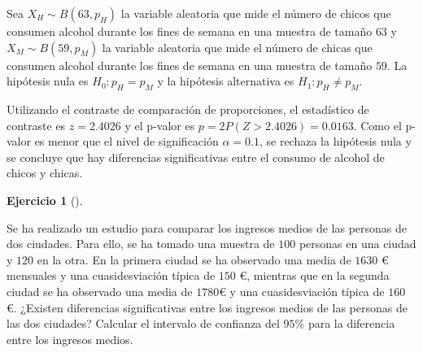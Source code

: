 \documentclass[
  spanish,
  a4paper,
]{scrreport}
\theoremstyle{definition}
\newtheorem{exercise}{Ejercicio}[chapter]
\theoremstyle{remark}
\begin{document}
\begin{tcolorbox}[enhanced jigsaw, arc=.35mm, bottomrule=.15mm, bottomtitle=1mm, breakable, colback=white, colbacktitle=quarto-callout-tip-color!10!white, colframe=quarto-callout-tip-color-frame, coltitle=black, left=2mm, leftrule=.75mm, opacityback=0, opacitybacktitle=0.6, rightrule=.15mm, title=\textcolor{quarto-callout-tip-color}{\faLightbulb}\hspace{0.5em}{Solución}, titlerule=0mm, toprule=.15mm, toptitle=1mm]

Sea \(X_H\sim B(63,p_H)\) la variable aleatoria que mide el número de
chicos que consumen alcohol durante los fines de semana en una muestra
de tamaño \(63\) y \(X_M\sim B(59,p_M)\) la variable aleatoria que mide
el número de chicas que consumen alcohol durante los fines de semana en
una muestra de tamaño \(59\). La hipótesis nula es \(H_0: p_H=p_M\) y la
hipótesis alternativa es \(H_1: p_H\neq p_M\).

Utilizando el contraste de comparación de proporciones, el estadístico
de contraste es \(z=2.4026\) y el p-valor es
\(p =2 P(Z>2.4026) = 0.0163\). Como el p-valor es menor que el nivel de
significación \(\alpha = 0.1\), se rechaza la hipótesis nula y se
concluye que hay diferencias significativas entre el consumo de alcohol
de chicos y chicas.

\end{tcolorbox}

\begin{exercise}[]\protect\hypertarget{exr-contraste-medias-ingresos}{}\label{exr-contraste-medias-ingresos}

Se ha realizado un estudio para comparar los ingresos medios de las
personas de dos ciudades. Para ello, se ha tomado una muestra de \(100\)
personas en una ciudad y \(120\) en la otra. En la primera ciudad se ha
observado una media de \(1630\) € mensuales y una cuasidesviación típica
de \(150\) €, mientras que en la segunda ciudad se ha observado una
media de \(1780\)€ y una cuasidesviación típica de \(160\) €. ¿Existen
diferencias significativas entre los ingresos medios de las personas de
las dos ciudades? Calcular el intervalo de confianza del \(95\)\% para
la diferencia entre los ingresos medios.

\end{exercise}
\end{document}

